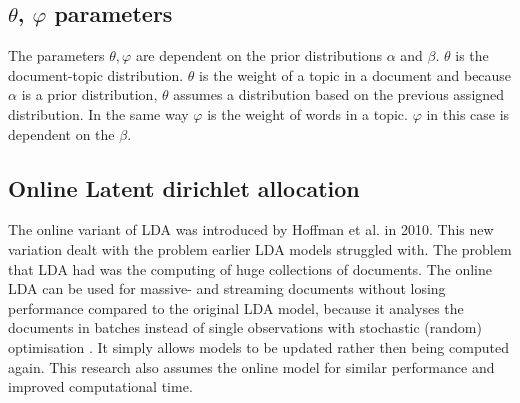 \subsection{$\theta$, $\varphi$ parameters}\label{theory:thetavarphi}
The parameters $\theta, \varphi$ are dependent on the prior distributions $\alpha$ and $\beta$. $\theta$ is the document-topic distribution. $\theta$ is the weight of a topic in a document and because $\alpha$ is a prior distribution, $\theta$ assumes a distribution based on the previous assigned distribution. 
In the same way $\varphi$ is the weight of words in a topic. $\varphi$ in this case is dependent on the $\beta$.

\subsection{Online Latent dirichlet allocation} \label{theory:onlinelda}
The online variant of LDA was introduced  by Hoffman et al. in 2010.\cite{Hoffman2010OnlineAllocation} This new variation dealt with the problem earlier LDA models struggled with. The problem that LDA had was the computing of huge collections of documents. The online LDA can be used for massive- and streaming documents without losing performance compared to the original LDA model, because it analyses the documents in batches instead of single observations with stochastic (random) optimisation \cite{Beaver2012}. It simply allows models to be updated rather then being computed again. This research also assumes the online model for similar performance and improved computational time. 


